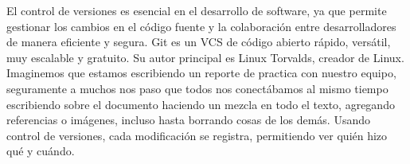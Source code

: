 El control de versiones es esencial en el desarrollo de software, ya que permite gestionar los cambios en el código fuente
y la colaboración entre desarrolladores de manera eficiente y segura. Git es un VCS de código abierto rápido, versátil, muy
escalable y gratuito. Su autor principal es Linux Torvalds, creador de Linux. \\

Imaginemos que estamos escribiendo un reporte de practica con nuestro equipo, seguramente a muchos nos paso que todos nos
conectábamos al mismo tiempo escribiendo sobre el documento haciendo un mezcla en todo el texto, agregando referencias o 
imágenes, incluso hasta borrando cosas de los demás. Usando control de versiones, cada modificación se registra,
permitiendo ver quién hizo qué y cuándo.\\



